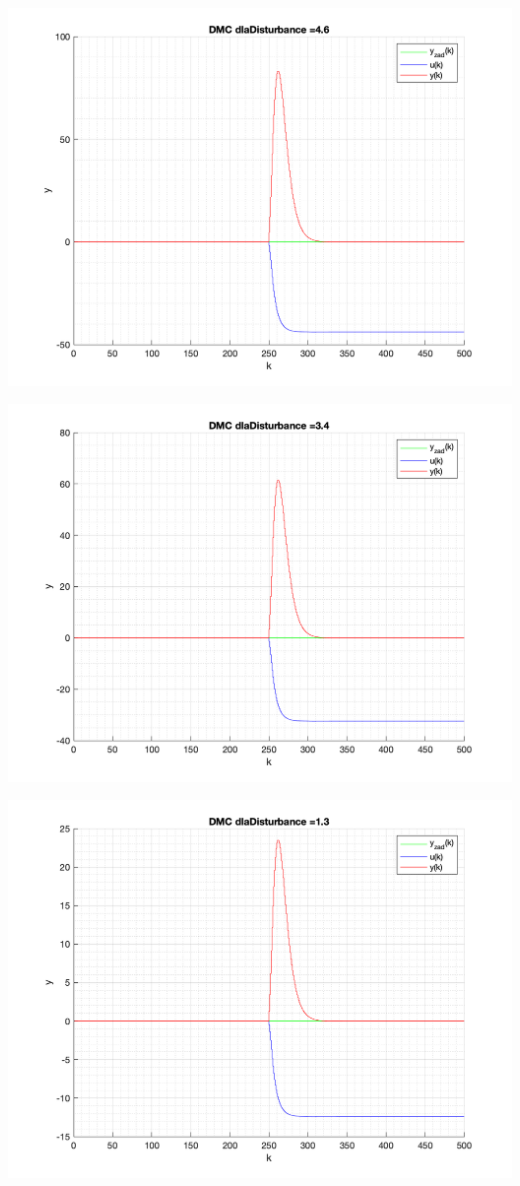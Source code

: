 \documentclass[a4paper, 11pt]{article}
\begin{document}
\begin{enumerate}
 \includegraphics[width=\linewidth]{./ModelsP4_Disturbance/P4_DMC_Disturbance_4_6_png.png} 
 
 \includegraphics[width=\linewidth]{./ModelsP4_Disturbance/P4_DMC_Disturbance_3_4_png.png} 
 
 \includegraphics[width=\linewidth]{./ModelsP4_Disturbance/P4_DMC_Disturbance_1_3_png.png} 
 

\end{enumerate}
\end{document}

